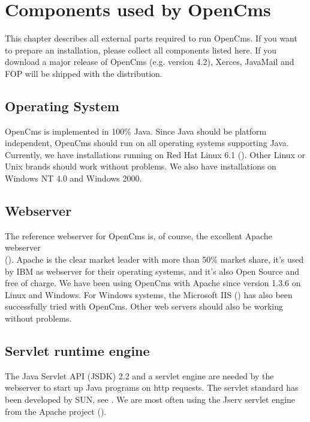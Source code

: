 \chapter{Components used by OpenCms}
\label{components}

This chapter describes all external parts required to run OpenCms.
If you want to prepare an installation, please collect all components listed here.
If you download a major release of OpenCms (e.g. version 4.2),
Xerces, JavaMail and FOP will be shipped with the distribution.

\section{Operating System}		
OpenCms is implemented in 100\% Java. Since Java should be platform independent, OpenCms should run 
on all operating systems supporting Java. Currently, we have installations running on 
Red Hat Linux 6.1 (). Other 
Linux or Unix brands should work without problems. We also have installations on 
Windows NT 4.0 and Windows 2000.   

\section{Webserver}
The reference webserver for OpenCms is, of course, the excellent Apache webserver \\
(). 
Apache is the clear market leader with more than 50\% market share, 
it's used by IBM as webserver for their operating systems, and it's also Open Source and 
free of charge. We have been using OpenCms with Apache since version 1.3.6 on Linux and Windows. 
For Windows systems, the Microsoft IIS ()
has also been successfully tried with OpenCms. Other web servers should also be working without problems.

\section{Servlet runtime engine}
The Java Servlet API (JSDK) 2.2 and a servlet engine are needed by the webserver 
to start up Java programs on http requests. 
The servlet standard has been developed by SUN, see 
.
We are most often using the Jserv servlet engine from
the Apache project (). 

